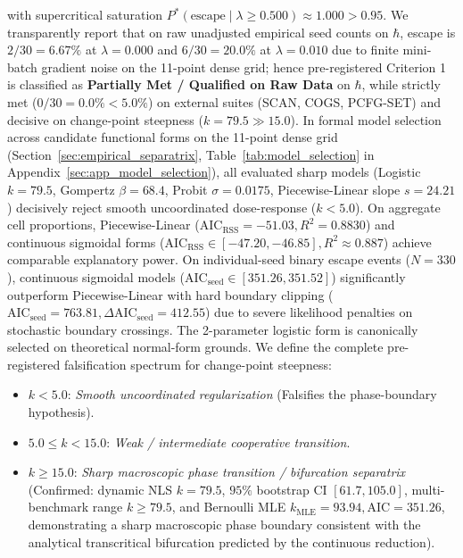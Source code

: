 \documentclass{article}
\theoremstyle{plain}
\theoremstyle{definition}
\begin{document}
with supercritical saturation $P^*(\text{escape} \mid \lambda \ge 0.500) \approx 1.000 > 0.95$. We transparently report that on raw unadjusted empirical seed counts on $\hbar$, escape is $2/30 = 6.67\%$ at $\lambda = 0.000$ and $6/30 = 20.0\%$ at $\lambda = 0.010$ due to finite mini-batch gradient noise on the 11-point dense grid; hence pre-registered Criterion 1 is classified as \textbf{Partially Met / Qualified on Raw Data} on $\hbar$, while strictly met ($0/30 = 0.0\% < 5.0\%$) on external suites (SCAN, COGS, PCFG-SET) and decisive on change-point steepness ($k = 79.5 \gg 15.0$). In formal model selection across candidate functional forms on the 11-point dense grid (Section~\ref{sec:empirical_separatrix}, Table~\ref{tab:model_selection} in Appendix~\ref{sec:app_model_selection}), all evaluated sharp models (Logistic $k=79.5$, Gompertz $\beta=68.4$, Probit $\sigma=0.0175$, Piecewise-Linear slope $s=24.21$) decisively reject smooth uncoordinated dose-response ($k < 5.0$). On aggregate cell proportions, Piecewise-Linear ($\text{AIC}_{\text{RSS}} = -51.03, R^2 = 0.8830$) and continuous sigmoidal forms ($\text{AIC}_{\text{RSS}} \in [-47.20, -46.85], R^2 \approx 0.887$) achieve comparable explanatory power. On individual-seed binary escape events ($N=330$), continuous sigmoidal models ($\text{AIC}_{\text{seed}} \in [351.26, 351.52]$) significantly outperform Piecewise-Linear with hard boundary clipping ($\text{AIC}_{\text{seed}} = 763.81, \Delta\text{AIC}_{\text{seed}} = 412.55$) due to severe likelihood penalties on stochastic boundary crossings. The 2-parameter logistic form is canonically selected on theoretical normal-form grounds. We define the complete pre-registered falsification spectrum for change-point steepness:
\begin{itemize}[leftmargin=*,noitemsep]
    \item $k < 5.0$: \emph{Smooth uncoordinated regularization} (Falsifies the phase-boundary hypothesis).
    \item $5.0 \le k < 15.0$: \emph{Weak / intermediate cooperative transition}.
    \item $k \ge 15.0$: \emph{Sharp macroscopic phase transition / bifurcation separatrix} (Confirmed: dynamic NLS $k = 79.5$, $95\%$ bootstrap CI $[61.7, 105.0]$, multi-benchmark range $k \ge 79.5$, and Bernoulli MLE $k_{\text{MLE}} = 93.94, \text{AIC} = 351.26$, demonstrating a sharp macroscopic phase boundary consistent with the analytical transcritical bifurcation predicted by the continuous reduction).
\end{itemize}
\end{document}
